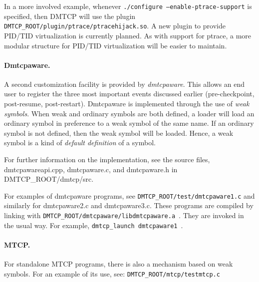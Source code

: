 \documentclass{article}
\begin{document}
In a more involved example, whenever {\tt ./configure
--enable-ptrace-support} is specified, then DMTCP will use the plugin
{\tt DMTCP\_ROOT/plugin/ptrace/ptracehijack.so}.  A new plugin to
provide PID/TID virtualization is currently planned.  As with support
for ptrace, a more modular structure for PID/TID virtualization will be
easier to maintain.

\paragraph{Dmtcpaware.}

A second customization facility is provided by {\em dmtcpaware}.
This allows an end user to register the three most important events
discussed earlier (pre-checkpoint, post-resume, post-restart).
Dmtcpaware is implemented through the use of {\em weak symbols}.
When weak and ordinary symbols are both defined, a loader will
load an ordinary symbol in preference to a weak symbol of the same name.
If an ordinary symbol is not defined, then the weak symbol will
be loaded.  Hence, a weak symbol is a kind of {\em default definition}
of a symbol.

For further information on the implementation, see the source files,
dmtcpawareapi.cpp, dmtcpaware.c, and dmtcpaware.h in DMTCP\_ROOT/dmtcp/src.

For examples of dmtcpaware programs, see
 {\tt DMTCP\_ROOT/test/dmtcpaware1.c} and similarly for dmtcpaware2.c and
dmtcpaware3.c.  These programs are compiled by linking with\hfil\break
{\tt DMTCP\_ROOT/dmtcpaware/libdmtcpaware.a}~.
They are invoked in the usual way.  For example, \newline
{\tt dmtcp\_launch dmtcpaware1}~.


\paragraph{MTCP.}

For standalone MTCP programs, there is also a mechanism based on
weak symbols.  For an example of its use, see:
{\tt DMTCP\_ROOT/mtcp/testmtcp.c}
\end{document}
